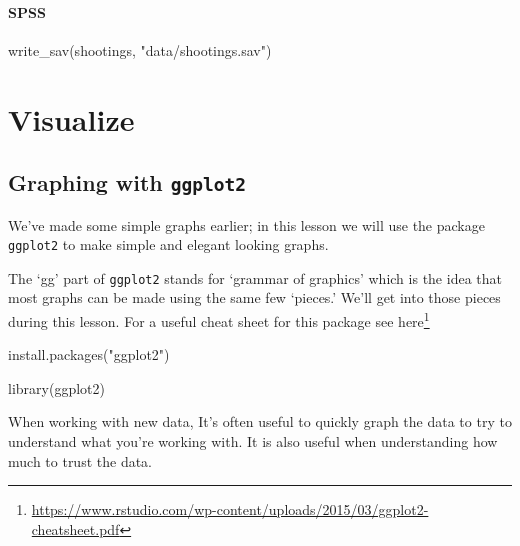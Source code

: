 \documentclass[
]{krantz}
\makeatletter
\newenvironment{Shaded}{\begin{snugshade}}{\end{snugshade}}
\newcommand{\FunctionTok}[1]{\textcolor[rgb]{0,0,0}{#1}}
\newcommand{\NormalTok}[1]{#1}
\newcommand{\StringTok}[1]{\textcolor[rgb]{0.5,0.5,0.5}{#1}}
\renewcommand{\href}[2]{#2\footnote{\url{#1}}}
\newenvironment{kframe}{%
\medskip{}
\setlength{\fboxsep}{.8em}
 \def\at@end@of@kframe{}%
 \ifinner\ifhmode%
  \def\at@end@of@kframe{\end{minipage}}%
  \begin{minipage}{\columnwidth}%
 \fi\fi%
 \def\FrameCommand##1{\hskip\@totalleftmargin \hskip-\fboxsep
 \colorbox{shadecolor}{##1}\hskip-\fboxsep
     \hskip-\linewidth \hskip-\@totalleftmargin \hskip\columnwidth}%
 \MakeFramed {\advance\hsize-\width
   \@totalleftmargin\z@ \linewidth\hsize
   \@setminipage}}%
 {\par\unskip\endMakeFramed%
 \at@end@of@kframe}
\renewenvironment{Shaded}{\begin{kframe}}{\end{kframe}}
\makeatother
\begin{document}
\hypertarget{spss-1}{%
\subsection{SPSS}\label{spss-1}}

\begin{Shaded}
\begin{Highlighting}[]
\FunctionTok{write\_sav}\NormalTok{(shootings, }\StringTok{"data/shootings.sav"}\NormalTok{)}
\end{Highlighting}
\end{Shaded}

\hypertarget{part-visualize}{%
\part{Visualize}\label{part-visualize}}

\hypertarget{graphing-intro}{%
\chapter{\texorpdfstring{Graphing with \texttt{ggplot2}}{Graphing with ggplot2}}\label{graphing-intro}}

We've made some simple graphs earlier; in this lesson we will use the package \texttt{ggplot2} to make simple and elegant looking graphs.

The `gg' part of \texttt{ggplot2} stands for `grammar of graphics' which is the idea that most graphs can be made using the same few `pieces.' We'll get into those pieces during this lesson. For a useful cheat sheet for this package see \href{https://www.rstudio.com/wp-content/uploads/2015/03/ggplot2-cheatsheet.pdf}{here}

\begin{Shaded}
\begin{Highlighting}[]
\FunctionTok{install.packages}\NormalTok{(}\StringTok{"ggplot2"}\NormalTok{)}
\end{Highlighting}
\end{Shaded}

\begin{Shaded}
\begin{Highlighting}[]
\FunctionTok{library}\NormalTok{(ggplot2)}
\end{Highlighting}
\end{Shaded}

When working with new data, It's often useful to quickly graph the data to try to understand what you're working with. It is also useful when understanding how much to trust the data.
\end{document}
